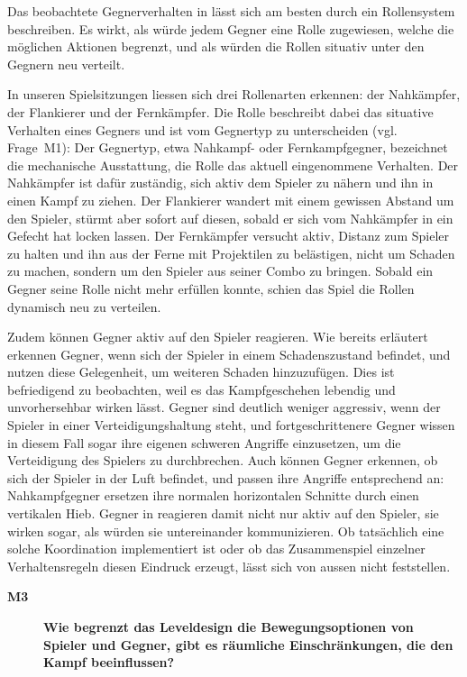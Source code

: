 \documentclass[../Main.tex]{subfiles}
\begin{document}
Das beobachtete Gegnerverhalten in  lässt sich am besten durch ein Rollensystem beschreiben. Es wirkt, als würde jedem Gegner eine Rolle zugewiesen, welche die möglichen Aktionen begrenzt, und als würden die Rollen situativ unter den Gegnern neu verteilt.

In unseren Spielsitzungen liessen sich drei Rollenarten erkennen: der Nahkämpfer, der Flankierer und der Fernkämpfer. Die Rolle beschreibt dabei das situative Verhalten eines Gegners und ist vom Gegnertyp zu unterscheiden (vgl. Frage~M1): Der Gegnertyp, etwa Nahkampf- oder Fernkampfgegner, bezeichnet die mechanische Ausstattung, die Rolle das aktuell eingenommene Verhalten. Der Nahkämpfer ist dafür zuständig, sich aktiv dem Spieler zu nähern und ihn in einen Kampf zu ziehen. Der Flankierer wandert mit einem gewissen Abstand um den Spieler, stürmt aber sofort auf diesen, sobald er sich vom Nahkämpfer in ein Gefecht hat locken lassen. Der Fernkämpfer versucht aktiv, Distanz zum Spieler zu halten und ihn aus der Ferne mit Projektilen zu belästigen, nicht um Schaden zu machen, sondern um den Spieler aus seiner Combo zu bringen. Sobald ein Gegner seine Rolle nicht mehr erfüllen konnte, schien das Spiel die Rollen dynamisch neu zu verteilen.

Zudem können Gegner aktiv auf den Spieler reagieren. Wie bereits erläutert erkennen Gegner, wenn sich der Spieler in einem Schadenszustand befindet, und nutzen diese Gelegenheit, um weiteren Schaden hinzuzufügen. Dies ist befriedigend zu beobachten, weil es das Kampfgeschehen lebendig und unvorhersehbar wirken lässt. Gegner sind deutlich weniger aggressiv, wenn der Spieler in einer Verteidigungshaltung steht, und fortgeschrittenere Gegner wissen in diesem Fall sogar ihre eigenen schweren Angriffe einzusetzen, um die Verteidigung des Spielers zu durchbrechen. Auch können Gegner erkennen, ob sich der Spieler in der Luft befindet, und passen ihre Angriffe entsprechend an: Nahkampfgegner ersetzen ihre normalen horizontalen Schnitte durch einen vertikalen Hieb. Gegner in  reagieren damit nicht nur aktiv auf den Spieler, sie wirken sogar, als würden sie untereinander kommunizieren. Ob tatsächlich eine solche Koordination implementiert ist oder ob das Zusammenspiel einzelner Verhaltensregeln diesen Eindruck erzeugt, lässt sich von aussen nicht feststellen.

\begin{description}
    \item[\textbf{M3}] \textbf{Wie begrenzt das Leveldesign die Bewegungsoptionen von Spieler und Gegner, gibt es räumliche Einschränkungen, die den Kampf beeinflussen?}
\end{description}
\end{document}
